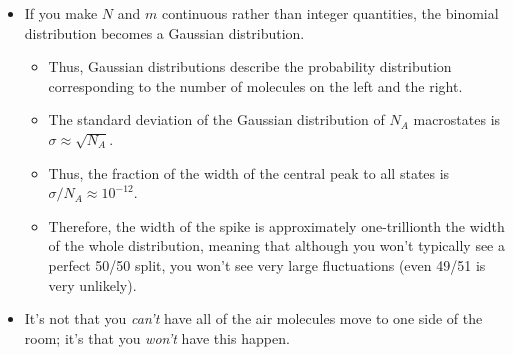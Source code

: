 \documentclass[../notes.tex]{subfiles}
\begin{document}
\begin{itemize}
\begin{itemize}
    \end{itemize}
    \item If you make $N$ and $m$ continuous rather than integer quantities, the binomial distribution becomes a Gaussian distribution.
    \begin{itemize}
        \item Thus, Gaussian distributions describe the probability distribution corresponding to the number of molecules on the left and the right.
        \item The standard deviation of the Gaussian distribution of $N_A$ macrostates is $\sigma\approx\sqrt{N_A}$.
        \item Thus, the fraction of the width of the central peak to all states is $\sigma/N_A\approx 10^{-12}$.
        \item Therefore, the width of the spike is approximately one-trillionth the width of the whole distribution, meaning that although you won't typically see a perfect 50/50 split, you won't see very large fluctuations (even 49/51 is very unlikely).
    \end{itemize}
    \item It's not that you \emph{can't} have all of the air molecules move to one side of the room; it's that you \emph{won't} have this happen.
\end{itemize}
\end{document}
